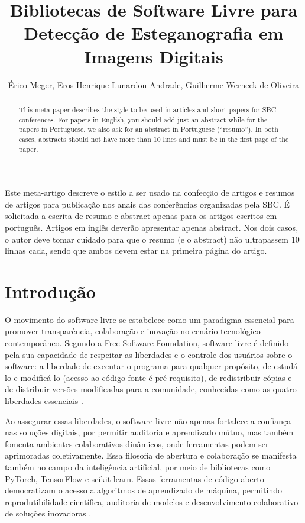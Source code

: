 \documentclass[12pt]{article}
\title{Bibliotecas de Software Livre para Detecção de Esteganografia em Imagens Digitais}
\author{Érico Meger\inst{1}, Eros Henrique Lunardon Andrade\inst{1}, Guilherme Werneck de Oliveira\inst{1}}
\begin{document}
\maketitle

\begin{abstract}
	This meta-paper describes the style to be used in articles and short papers
	for SBC conferences. For papers in English, you should add just an abstract
	while for the papers in Portuguese, we also ask for an abstract in
	Portuguese (``resumo''). In both cases, abstracts should not have more than
	10 lines and must be in the first page of the paper.
\end{abstract}

\begin{resumo}
	Este meta-artigo descreve o estilo a ser usado na confecção de artigos e
	resumos de artigos para publicação nos anais das conferências organizadas
	pela SBC. É solicitada a escrita de resumo e abstract apenas para os artigos
	escritos em português. Artigos em inglês deverão apresentar apenas abstract.
	Nos dois casos, o autor deve tomar cuidado para que o resumo (e o abstract)
	não ultrapassem 10 linhas cada, sendo que ambos devem estar na primeira
	página do artigo.
\end{resumo}

\section{Introdução}

O movimento do software livre se estabelece como um paradigma essencial para
promover transparência, colaboração e inovação no cenário tecnológico
contemporâneo. Segundo a Free Software Foundation, software livre é definido
pela sua capacidade de respeitar as liberdades e o controle dos usuários sobre
o software: a liberdade de executar o programa para qualquer propósito, de
estudá-lo e modificá-lo (acesso ao código-fonte é pré-requisito), de
redistribuir cópias e de distribuir versões modificadas para a comunidade,
conhecidas como as quatro liberdades essenciais \cite{gnu_freesw}.

Ao assegurar essas liberdades, o software livre não apenas fortalece a
confiança nas soluções digitais, por permitir auditoria e aprendizado mútuo,
mas também fomenta ambientes colaborativos dinâmicos, onde ferramentas podem
ser aprimoradas coletivamente. Essa filosofia de abertura e colaboração se
manifesta também no campo da inteligência artificial, por meio de bibliotecas
como PyTorch, TensorFlow e scikit-learn. Essas ferramentas de código aberto
democratizam o acesso a algoritmos de aprendizado de máquina, permitindo
reprodutibilidade científica, auditoria de modelos e desenvolvimento
colaborativo de soluções inovadoras \cite{pytorch_about, tensorflow_about}.
\end{document}
